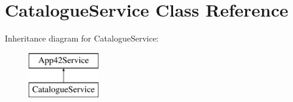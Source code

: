 \hypertarget{class_catalogue_service}{\section{Catalogue\+Service Class Reference}
\label{class_catalogue_service}
}
Inheritance diagram for Catalogue\+Service\+:\begin{figure}[H]
\begin{center}
\leavevmode
\includegraphics[height=2.000000cm]{class_catalogue_service}
\end{center}
\end{figure}
